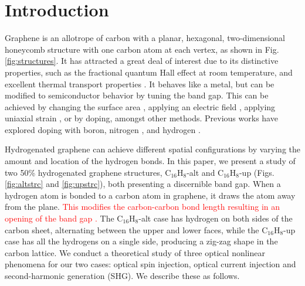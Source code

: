 \documentclass[pss]{wiley2sp} %
\begin{document}
\maketitle


\section{Introduction}\label{sec:intro}

Graphene is an allotrope of carbon with a planar, hexagonal, two-dimensional
honeycomb structure with one carbon atom at each vertex, as shown in Fig.
\ref{fig:structures}. It has attracted a great deal of interest due to its
distinctive properties, such as the fractional quantum Hall effect at room
temperature, and excellent thermal transport properties
\cite{geimNM07,reinaNL08,novoselov2S7,balandinNL08}. It behaves like a metal,
but can be modified to semiconductor behavior by tuning the band gap. This can
be achieved by changing the surface area \cite{hanPRL07}, applying an electric
field \cite{zhangN09}, applying uniaxial strain \cite{niACSN08}, or by doping,
amongst other methods. Previous works have explored doping with boron,
nitrogen \cite{guoIJ11}, and hydrogen
\cite{eliasS09,guisingerNL09,samarakoonACSN10}.

Hydrogenated graphene can achieve different spatial configurations by varying
the amount and location of the hydrogen bonds. In this paper, we present a
study of two 50\% hydrogenated graphene structures, C$_{16}$H$_{8}$-alt and
C$_{16}$H$_{8}$-up (Figs. \ref{fig:altstrc} and \ref{fig:upstrc}), both
presenting a discernible band gap. When a hydrogen atom is bonded to a carbon
atom in graphene, it draws the atom away from the plane. 
\textcolor{red}{
This modifies the
carbon-carbon bond length resulting in an opening of the band gap
\cite{eliasS09,boukhvalovPRB08}. 
}
The C$_{16}$H$_{8}$-alt case has hydrogen on
both sides of the carbon sheet, alternating between the upper and lower faces,
while the C$_{16}$H$_{8}$-up case has all the hydrogens on a single side,
producing a zig-zag shape in the carbon lattice. We conduct a theoretical study
of three optical nonlinear phenomena for our two cases: optical spin
injection, optical current injection and second-harmonic generation
(SHG). We describe these as follows.
\end{document}
